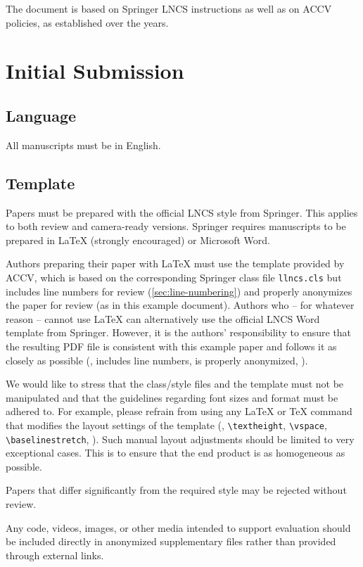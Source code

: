 \documentclass[runningheads]{llncs}
\begin{document}
The document is based on Springer LNCS instructions as well as on ACCV policies, as established over the years.

\section{Initial Submission}

\subsection{Language}
All manuscripts must be in English.


\subsection{Template}
Papers must be prepared with the official LNCS style from Springer.
This applies to both review and camera-ready versions.
Springer requires manuscripts to be prepared in \LaTeX{} (strongly encouraged) or Microsoft Word. 

Authors preparing their paper with \LaTeX{} must use the template provided by ACCV, which is based on the corresponding Springer class file \texttt{llncs.cls} but includes line numbers for review (\cref{sec:line-numbering}) and properly anonymizes the paper for review (as in this example document).
Authors who -- for whatever reason -- cannot use \LaTeX{} can alternatively use the official LNCS Word template from Springer.
However, it is the authors' responsibility to ensure that the resulting PDF file is consistent with this example paper and follows it as closely as possible (\ie, includes line numbers, is properly anonymized, \etc).

We would like to stress that the class/style files and the template must not be manipulated and that the guidelines regarding font sizes and format must be adhered to. 
For example, please refrain from using any \LaTeX{} or \TeX{} command that modifies the layout settings of the template (\eg, \verb+\textheight+, \verb+\vspace+, \verb+\baselinestretch+, \etc).
Such manual layout adjustments should be limited to very exceptional cases.
This is to ensure that the end product is as homogeneous as possible.

Papers that differ significantly from the required style may be rejected without review.

Any code, videos, images, or other media intended to support evaluation should be included directly in anonymized supplementary files rather than provided through external links.
\end{document}
